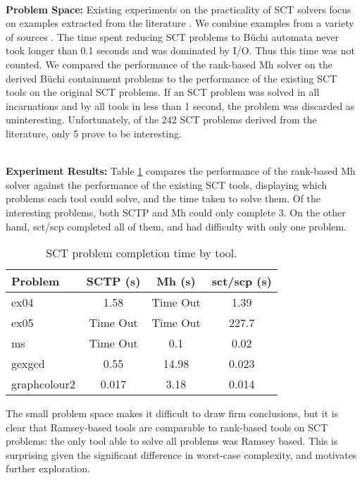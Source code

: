 \documentclass{LMCS}
\newcommand{\standout}[1]{\noindent \\ \textbf{#1}}
\newcommand\hide[1]{}
\newcommand\buchi{B\"uchi }
\begin{document}
\standout{Problem Space:} Existing experiments on the practicality of SCT
solvers focus on examples extracted from the literature \cite{BL07}.  We combine
examples from a variety of sources
\cite{Daedalus,BL07,Fred01,Glen99,LJB01,SJ05,Wahl00}. The time spent reducing
SCT problems to \buchi automata never took longer than 0.1 seconds and was
dominated by I/O.  Thus this time was not counted\hide{Experimenting reveals
a statistically insignificant \emph{slowdown} when reading the SCT problem and
performing the reduction.}. We compared the performance of the rank-based Mh
solver on the derived \buchi containment problems to the performance of the
existing SCT tools on the original SCT problems. If an SCT problem was solved in
all incarnations and by all tools in less than 1 second, the problem was
discarded as uninteresting.  Unfortunately, of the 242 SCT problems derived from
the literature, only 5 prove to be interesting.


\standout{Experiment Results:} Table \ref{Table:SCT_Completion} compares the performance
of the rank-based Mh solver against the performance of the existing SCT tools,
displaying which problems each tool could solve, and the time taken to solve
them. Of the interesting problems, both SCTP and Mh could only complete 3.
On the other hand, sct/scp completed all of them, and had difficulty with only
one problem. 


\begin{table}[!htp]
\vspace{0.17in}
\centering
\begin{tabular}{|l|c|c|c|}
\hline Problem & SCTP (s) & Mh (s) & sct/scp (s) \\
\hline ex04 \cite{BL07} & 1.58& Time Out & 1.39 \\
\hline ex05 \cite{BL07} & Time Out & Time Out & 227.7 \\
\hline ms \cite{Fred01} &  Time Out & 0.1 & 0.02 \\
\hline gexgcd \cite{Fred01} & 0.55 & 14.98 &  0.023 \\
\hline graphcolour2 \cite{Glen99} &  0.017 & 3.18 & 0.014 \\
\hline
\end{tabular}
\vspace{0.05in}
\caption{SCT problem completion time by tool.}\label{Table:SCT_Completion}
\end{table}

The small problem space makes it difficult to draw firm conclusions, but it is
clear that Ramsey-based tools are comparable to rank-based tools on SCT
problems: the only tool able to solve all problems was Ramsey based. This is
surprising given the significant difference in worst-case complexity, and
motivates further exploration.
\end{document}
